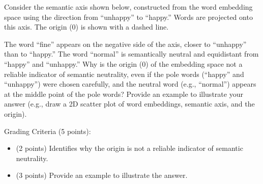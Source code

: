 \documentclass[11pt,addpoints,answers]{exam}
\begin{document}
\begin{questions}
\question[5] Consider the semantic axis shown below, constructed from the word embedding space using the direction from ``unhappy'' to ``happy.'' Words are projected onto this axis. The origin (0) is shown with a dashed line.

\begin{center}
\end{center}

The word ``fine'' appears on the negative side of the axis, closer to ``unhappy'' than to ``happy.''
The word ``normal'' is semantically neutral and equidistant from ``happy'' and ``unhappy.''
Why is the origin (0) of the embedding space not a reliable indicator of semantic neutrality, even if the pole words (``happy'' and ``unhappy'') were chosen carefully, and the neutral word (e.g., ``normal'') appears at the middle point of the pole words? Provide an example to illustrate your answer (e.g., draw a 2D scatter plot of word embeddings, semantic axis, and the origin).

Grading Criteria (5 points):
\begin{itemize}
  \item (2 points) Identifies why the origin is not a reliable indicator of semantic neutrality.
  \item (3 points) Provide an example to illustrate the answer.
\end{itemize}


\end{questions}
\end{document}
